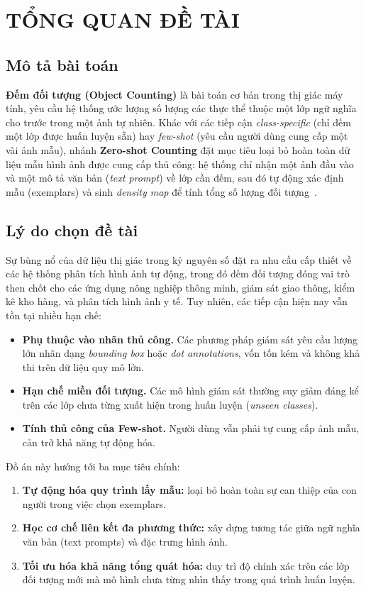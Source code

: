 \documentclass[a4paper,12pt]{report}
\numberwithin{figure}{chapter}
\numberwithin{table}{chapter}
\begin{document}
\chapter{TỔNG QUAN ĐỀ TÀI}
\label{ch:overview}

\section{Mô tả bài toán}
\textbf{Đếm đối tượng (Object Counting)} là bài toán cơ bản trong thị giác máy tính, yêu cầu hệ thống ước lượng số lượng các thực thể thuộc một lớp ngữ nghĩa cho trước trong một ảnh tự nhiên. Khác với các tiếp cận \textit{class-specific} (chỉ đếm một lớp được huấn luyện sẵn) hay \textit{few-shot} (yêu cầu người dùng cung cấp một vài ảnh mẫu), nhánh \textbf{Zero-shot Counting} đặt mục tiêu loại bỏ hoàn toàn dữ liệu mẫu hình ảnh được cung cấp thủ công: hệ thống chỉ nhận một ảnh đầu vào và một mô tả văn bản (\textit{text prompt}) về lớp cần đếm, sau đó tự động xác định mẫu (exemplars) và sinh \textit{density map} để tính tổng số lượng đối tượng~\cite{vacount, richprompts}.

\section{Lý do chọn đề tài}
Sự bùng nổ của dữ liệu thị giác trong kỷ nguyên số đặt ra nhu cầu cấp thiết về các hệ thống phân tích hình ảnh tự động, trong đó đếm đối tượng đóng vai trò then chốt cho các ứng dụng nông nghiệp thông minh, giám sát giao thông, kiểm kê kho hàng, và phân tích hình ảnh y tế. Tuy nhiên, các tiếp cận hiện nay vẫn tồn tại nhiều hạn chế:

\begin{itemize}
    \item \textbf{Phụ thuộc vào nhãn thủ công.} Các phương pháp giám sát yêu cầu lượng lớn nhãn dạng \textit{bounding box} hoặc \textit{dot annotations}, vốn tốn kém và không khả thi trên dữ liệu quy mô lớn.
    \item \textbf{Hạn chế miền đối tượng.} Các mô hình giám sát thường suy giảm đáng kể trên các lớp chưa từng xuất hiện trong huấn luyện (\textit{unseen classes}).
    \item \textbf{Tính thủ công của Few-shot.} Người dùng vẫn phải tự cung cấp ảnh mẫu, cản trở khả năng tự động hóa.
\end{itemize}

Đồ án này hướng tới ba mục tiêu chính:

\begin{enumerate}
    \item \textbf{Tự động hóa quy trình lấy mẫu:} loại bỏ hoàn toàn sự can thiệp của con người trong việc chọn exemplars.
    \item \textbf{Học cơ chế liên kết đa phương thức:} xây dựng tương tác giữa ngữ nghĩa văn bản (text prompts) và đặc trưng hình ảnh.
    \item \textbf{Tối ưu hóa khả năng tổng quát hóa:} duy trì độ chính xác trên các lớp đối tượng mới mà mô hình chưa từng nhìn thấy trong quá trình huấn luyện.
\end{enumerate}
\end{document}
